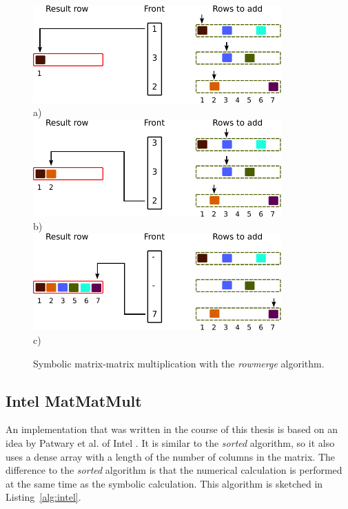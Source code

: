 \begin{figure}[H]
\centering
\includegraphics[width=0.85\textwidth]{row/spgemm-row-1}\\
a)\\
\vspace*{6mm}
\includegraphics[width=0.85\textwidth]{row/spgemm-row-2}\\
b)\\
\vspace*{6mm}
\includegraphics[width=0.85\textwidth]{row/spgemm-row-6}\\
c)\\
\vspace*{6mm}
\caption{Symbolic matrix-matrix multiplication with the \textit{rowmerge} algorithm.}
\label{fig:spgemm-row}
\end{figure}


\subsection{Intel MatMatMult}
An implementation that was written in the course of this thesis is based on an idea by Patwary et al. of Intel \cite{intel_algorithm}. It is similar to the \textit{sorted} algorithm, so it also uses a dense array with a length of the number of columns in the matrix. The difference to the \textit{sorted} algorithm is that the  numerical calculation is performed at the same time as the symbolic calculation. This algorithm is sketched in Listing~\ref{alg:intel}.

